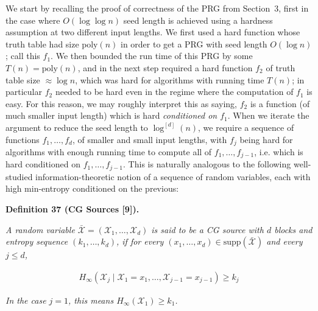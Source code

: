 \documentclass[10pt,a4paper]{article}
\begin{document}
We start by recalling the proof of correctness of the PRG from Section 3, first in the case where $O(\log\log n)$ seed length is achieved using a hardness assumption at two different input lengths. We first used a hard function whose truth table had size $\mathrm{poly}(n)$ in order to get a PRG with seed length $O(\log n)$; call this $f_{1}$. We then bounded the run time of this PRG by some $T(n)=\mathrm{poly}(n)$, and in the next step required a hard function $f_{2}$ of truth table size $\approx\log n$, which was hard for algorithms with running time $T(n)$; in particular $f_{2}$ needed to be hard even in the regime where the computation of $f_{1}$ is easy. For this reason, we may roughly interpret this as saying, $f_{2}$ is a function (of much smaller input length) which is hard \emph{conditioned on $f_{1}$}.
When we iterate the argument to reduce the seed length to $\log^{[d]}(n)$, we require a sequence of functions $f_{1},\ldots,f_{d}$, of smaller and small input lengths, with $f_{j}$ being hard for algorithms with enough running time to compute all of $f_{1},\ldots,f_{j-1}$, i.e. which is hard conditioned on $f_{1},\ldots,f_{j-1}$. This is naturally analogous to the following well-studied information-theoretic notion of a sequence of random variables, each with high min-entropy conditioned on the previous:\par





\par\medskip\noindent\textbf{
\textbf{Definition 37}\textbf{ }(CG Sources [9])\textbf{.}
}\par



\emph{A random variable $\bar{\mathcal{X}}=(\mathcal{X}_{1},\ldots,\mathcal{X}_{d})$ is said to be a CG source with $d$ blocks and entropy sequence $(k_{1},\ldots,k_{d})$, if for every $(x_{1},\ldots,x_{d})\in\mathrm{supp}(\bar{\mathcal{X}})$ and every $j\leq d$,}\par


\[\begin{gathered}
H_{\infty}(\mathcal{X}_{j}\mid\mathcal{X}_{1}=x_{1},\ldots,\mathcal{X}_{j-1}=x_{j-1})\geq k_{j}
\end{gathered}\]


\emph{In the case $j=1$, this means $H_{\infty}(\mathcal{X}_{1})\geq k_{1}$.}\par



\end{document}
